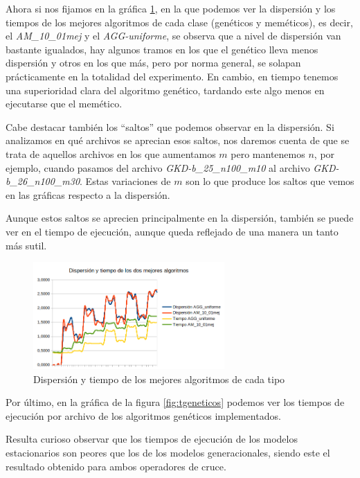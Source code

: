 Ahora si nos fijamos en la gráfica \ref{fig:dispYT_mejores}, en la que podemos ver la dispersión y los tiempos de los mejores algoritmos de cada clase (genéticos y meméticos), es decir, el \textit{AM\_10\_01mej} y el \textit{AGG-uniforme}, se observa que a nivel de dispersión van bastante igualados, hay algunos tramos en los que el genético lleva menos dispersión y otros en los que más, pero por norma general, se solapan prácticamente en la totalidad del experimento. En cambio, en tiempo tenemos una superioridad clara del algoritmo genético, tardando este algo menos en ejecutarse que el memético.

Cabe destacar también los ``saltos'' que podemos observar en la dispersión. Si analizamos en qué archivos se aprecian esos saltos, nos daremos cuenta de que se trata de aquellos archivos en los que aumentamos $m$ pero mantenemos $n$, por ejemplo, cuando pasamos del archivo \textit{GKD-b\_25\_n100\_m10} al archivo \textit{GKD-b\_26\_n100\_m30}. Estas variaciones de $m$ son lo que produce los saltos que vemos en las gráficas respecto a la dispersión.

Aunque estos saltos se aprecien principalmente en la dispersión, también se puede ver en el tiempo de ejecución, aunque queda reflejado de una manera un tanto más sutil.

\begin{figure}[H]
    \centering
	\includegraphics[width=0.65\textwidth]{data/dispYT_mejores.png}
	\caption{Dispersión y tiempo de los mejores algoritmos de cada tipo}
	\label{fig:dispYT_mejores}
\end{figure}

Por último, en la gráfica de la figura \ref{fig:tgeneticos} podemos ver los tiempos de ejecución por archivo de los algoritmos genéticos implementados.

Resulta curioso observar que los tiempos de ejecución de los modelos estacionarios son peores que los de los modelos generacionales, siendo este el resultado obtenido para ambos operadores de cruce.


